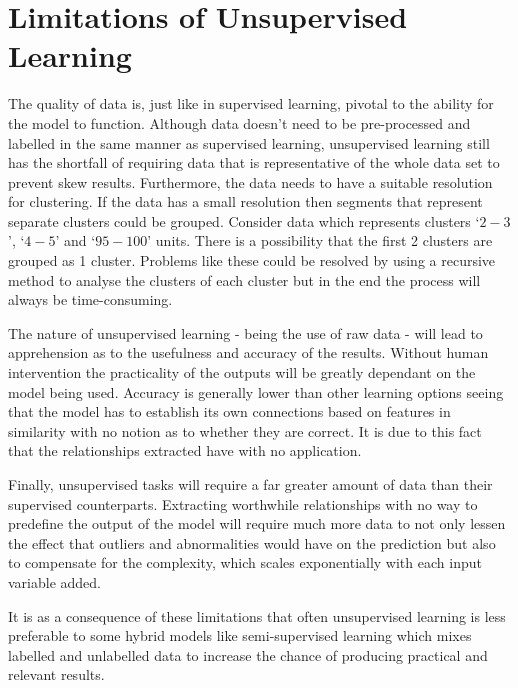 \documentclass[10pt,a4paper]{report}
\begin{document}
			\section{Limitations of Unsupervised Learning}
				The quality of data is, just like in supervised learning, pivotal to the ability for the model to function. Although data
				doesn't need to be pre-processed and labelled in the same manner as supervised learning, unsupervised learning
				still has the shortfall of requiring data that is representative of the whole data set to prevent skew results. Furthermore,
				the data needs to have a suitable resolution for clustering. If the data has a small resolution then segments that represent separate clusters could be
				grouped. Consider data which represents clusters `$2-3$', `$4-5$' and `$95-100$' units. There is a possibility that the first 2 clusters are grouped as 1 cluster.
				Problems like these could be resolved by using a recursive method to analyse the clusters of each cluster but in the end the process will always be time-consuming. \par
				The nature of unsupervised learning - being the use of raw data - will lead to apprehension as to the usefulness and accuracy of the results. Without human intervention the
				practicality of the outputs will be greatly dependant on the model being used. Accuracy is generally lower than other learning options seeing that the model has to
				establish its own connections based on features in similarity with no notion as to whether they are correct. It is due to this fact that the relationships extracted have with no application. \par
				Finally, unsupervised tasks will require a far greater amount of data than their supervised counterparts. Extracting worthwhile relationships with no way to predefine the output
				of the model will require much more data to not only lessen the effect that outliers and abnormalities would have on the prediction but also to compensate for the complexity, which scales
				exponentially with each input variable added. \par
				It is as a consequence of these limitations that often unsupervised learning is less preferable to some hybrid models like semi-supervised learning which mixes labelled and unlabelled data
				to increase the chance of producing practical and relevant results.
\end{document}
